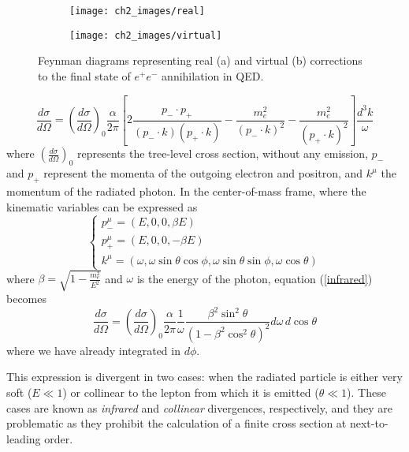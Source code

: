 \documentclass[10pt,a4paper]{book}
\begin{document}
\begin{figure}[h!]
\begin{subfigure}{.5\textwidth}
\centering
\texttt{[image: ch2\_images/real]}
\label{real}
\caption{}
\end{subfigure}
\begin{subfigure}{.5\textwidth}
\centering
\texttt{[image: ch2\_images/virtual]}
\label{virtual}
\caption{}
\end{subfigure}
\caption{Feynman diagrams representing real (a) and virtual (b) corrections to the final state of $e^+e^-$ annihilation in QED.}
\end{figure}

\begin{equation}
\frac{d\sigma}{d\Omega} = \left(\frac{d\sigma}{d\Omega} \right)_0 \frac{\alpha}{2\pi}\left[2\frac{p_- \cdot p_+}{(p_-\cdot k) (p_+ \cdot k)} - \frac{m_e^2}{(p_-\cdot k)^2} - \frac{m_e^2}{(p_+ \cdot k)^2} \right]\frac{d^3k}{\omega}
\label{infrared}
\end{equation}
where $\left(\frac{d\sigma}{d\Omega} \right)_0$ represents the tree-level cross section, without any emission, $p_-$ and $p_+$ represent the momenta of the outgoing electron and positron, and $k^\mu$ the momentum of the radiated photon. In the center-of-mass frame, where the kinematic variables can be expressed as
\begin{equation}
\begin{cases}
p_-^\mu = (E, 0, 0, \beta E)\\
p_+^\mu = (E, 0, 0, -\beta E)\\
k^\mu = (\omega, \omega \sin\theta\cos\phi, \omega\sin\theta\sin\phi, \omega\cos\theta)
\end{cases}
\end{equation}
where $\beta = \sqrt{1 - \frac{m_e^2}{E^2}}$ and $\omega$ is the energy of the photon, equation (\ref{infrared}) becomes
\begin{equation}
\frac{d\sigma}{d\Omega} = \left(\frac{d\sigma}{d\Omega} \right)_0 \frac{\alpha}{2\pi}\frac{1}{\omega}\frac{\beta^2\sin^2\theta}{(1-\beta^2\cos^2\theta)^2}d\omega \, d\cos\theta
\end{equation}
where we have already integrated in $d\phi$.

This expression is divergent in two cases: when the radiated particle is either very soft ($E \ll 1$) or collinear to the lepton from which it is emitted ($\theta \ll 1$). These cases are known as \emph{infrared} and \emph{collinear} divergences, respectively, and they are problematic as they prohibit the calculation of a finite cross section at next-to-leading order. 
\end{document}
